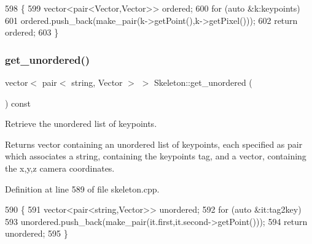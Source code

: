 \begin{DoxyCode}
598 \{
599     vector<pair<Vector,Vector>> ordered;
600     \textcolor{keywordflow}{for} (\textcolor{keyword}{auto} &k:keypoints)
601         ordered.push\_back(make\_pair(k->getPoint(),k->getPixel()));
602     \textcolor{keywordflow}{return} ordered;
603 \}
\end{DoxyCode}
\mbox{\label{classassistive__rehab_1_1Skeleton_a7b9f01b2b0f5450920335347c5861a2f}} 
\subsubsection{\texorpdfstring{get\+\_\+unordered()}{get\_unordered()}}
{\footnotesize\ttfamily vector$<$ pair$<$ string, Vector $>$ $>$ Skeleton\+::get\+\_\+unordered (\begin{DoxyParamCaption}{ }\end{DoxyParamCaption}) const\hspace{0.3cm}{\ttfamily [virtual]}}



Retrieve the unordered list of keypoints. 

\begin{DoxyReturn}{Returns}
vector containing an unordered list of keypoints, each specified as pair which associates a string, containing the keypoint\textquotesingle{}s tag, and a vector, containing the x,y,z camera coordinates. 
\end{DoxyReturn}


Definition at line 589 of file skeleton.\+cpp.


\begin{DoxyCode}
590 \{
591     vector<pair<string,Vector>> unordered;
592     \textcolor{keywordflow}{for} (\textcolor{keyword}{auto} &it:tag2key)
593         unordered.push\_back(make\_pair(it.first,it.second->getPoint()));
594     \textcolor{keywordflow}{return} unordered;
595 \}
\end{DoxyCode}
\mbox{\label{classassistive__rehab_1_1Skeleton_a513a3dc56d55a7b10b256378ae63c6c7}} 
